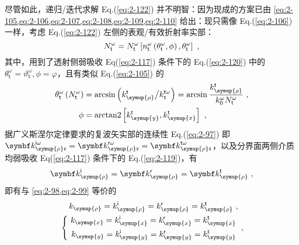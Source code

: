 尽管如此，递归/迭代求解 Eq.(\ref{eq:2-122}) 并不明智：因为现成的方案已由 \cref{eq:2-105,eq:2-106,eq:2-107,eq:2-108,eq:2-109,eq:2-110} 给出：现只需像 Eq.(\ref{eq:2-106}) 一样，考虑 Eq.(\ref{eq:2-122}) 左侧的表观/有效折射率实部：
\begin{equation} \label{eq:2-123}
	\abovedisplayskip=10pt
	\belowdisplayskip=13pt
	N^{\omega}_{\mathsf{t}} = N^{\omega}_{\mathsf{t}} \left[ n^{\omega}_{\mathsf{t}} \left( \theta^{\omega}_{\mathsf{t}}, \phi \right), \theta^{\omega}_{\mathsf{t}} \right] ~,
\end{equation}
其中，用到了透射侧弱吸收 Eq(\ref{eq:2-117}) 条件下的 Eq.(\ref{eq:2-120}) 中的 $\theta^{\omega}_{\mathsf{t}} = \vartheta^{\omega}_{\mathsf{t}}, \phi = \varphi$，且有类似 Eq.(\ref{eq:2-105}) 的
\begin{subequations} \label{eq:2-124}
\abovedisplayskip=8pt
\belowdisplayskip=10pt
\begin{align}
	\theta^{\omega}_{\mathsf{t}} \left( N^{\omega}_{\mathsf{t}} \right) &= \arcsin \left( k^{\mathsf{t}}_{\symup{\rho}} \big/ k^{{\mathsf{t}}\omega}_{\mathfrak{r}} \right) = \arcsin \frac{ k^{\mathsf{t}}_{\symup{\rho}} }{ k^{\omega}_{0} N^{\omega}_{\mathsf{t}} } \label{eq:2-124a}~,\\ \phi &= \text{arctan2} \left[k^{\mathsf{t}}_{\symup{y}}, k^{\mathsf{t}}_{\symup{x}}\right] \label{eq:2-124b} ~,
\end{align}
\end{subequations}
据广义斯涅尔定律要求的复波矢实部的连续性 Eq.(\ref{eq:2-97}) 即 ${\symbf k}^{\mathsf{i}\omega}_{\symup{\rho}\mathfrak{r}} = {\symbf k}^{\mathsf{r}\omega}_{\symup{\rho}\mathfrak{r}} = {\symbf k}^{\mathsf{t}\omega}_{\symup{\rho}\mathfrak{r}}$，以及分界面两侧介质均弱吸收 Eq(\ref{eq:2-117}) 条件下的 Eq.(\ref{eq:2-119})，有
\begin{equation} \label{eq:2-125}
	\abovedisplayskip=13pt
	\belowdisplayskip=13pt
	{\symbf k}^{\mathsf{i}}_{\symup{\rho}} = {\symbf k}^{\mathsf{r}}_{\symup{\rho}} = {\symbf k}^{\mathsf{t}}_{\symup{\rho}} ~,
\end{equation}
即有与 \cref{eq:2-98,eq:2-99} 等价的
\begin{subequations} \label{eq:2-126}
\abovedisplayskip=8pt
\belowdisplayskip=13pt
\begin{align}
	&\hspace{1.1em} k_{\symup{\rho}} = k^{\mathsf{i}}_{\symup{\rho}} = k^{\mathsf{r}}_{\symup{\rho}} = k^{\mathsf{t}}_{\symup{\rho}} \label{eq:2-126a}~,\\ &\left\{\ \begin{aligned} k_{\symup{x}} = k^{\mathsf{i}}_{\symup{x}} = k^{\mathsf{r}}_{\symup{x}} = k^{\mathsf{t}}_{\symup{x}} \\ k_{\symup{y}} = k^{\mathsf{i}}_{\symup{y}} = k^{\mathsf{r}}_{\symup{y}} = k^{\mathsf{t}}_{\symup{y}} \end{aligned}\right. \label{eq:2-126b}~,
\end{align}
\end{subequations}
